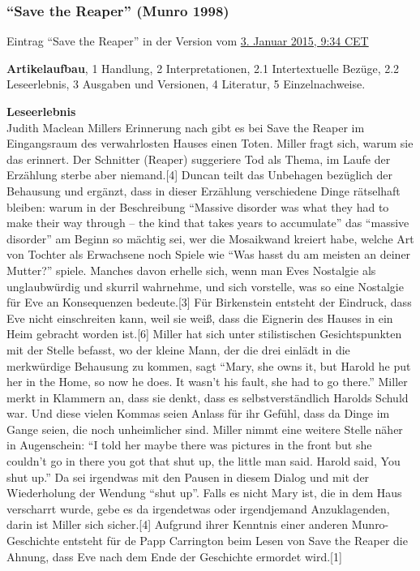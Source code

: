 \documentclass[fontsize=12pt]{scrartcl}
\begin{document}
\subsubsection{"`Save the Reaper"' (Munro 1998)}
\label{subsubsec:6.1.8}

Eintrag "`Save the Reaper"' in der Version vom \href{https://de.wikipedia.org/w/index.php?title=Save_the_Reaper\&oldid=137361185}{3. Januar 2015, 9:34 CET}

\textbf{Artikelaufbau}, 1 Handlung, 2 Interpretationen, 2.1 Intertextuelle Bez\"uge, 2.2 Le\-se\-er\-lebnis, 3 Ausgaben und Versionen, 4 Li\-te\-ra\-tur, 5 Einzelnachweise.

\textbf{Leseerlebnis}\\
Judith Maclean Millers Erinnerung nach gibt es bei Save the Reaper im Ein\-gangs\-raum des verwahrlosten Hauses einen Toten. Miller fragt sich, warum sie das erinnert. Der Schnitter (Reaper) suggeriere Tod als Thema, im Laufe der Erz\"ahlung sterbe aber niemand.[4] Duncan teilt das Unbehagen bez\"uglich der Behausung und erg\"anzt, dass in dieser Erz\"ahlung verschiedene Dinge r\"atselhaft bleiben: warum in der Beschreibung "`Massive disorder was what they had to make their way through -- the kind that takes years to accumulate"' das "`massive disorder"' am Beginn so m\"achtig sei, wer die Mosaikwand kreiert habe, welche Art von Tochter als Erwachsene noch Spiele wie "`Was hasst du am meisten an deiner Mutter?"' spiele. Manches davon erhelle sich, wenn man Eves Nostalgie als unglaub\-w\"urdig und skurril wahrnehme, und sich vorstelle, was so eine Nostalgie f\"ur Eve an Konsequenzen bedeute.[3] F\"ur Birkenstein entsteht der Eindruck, dass Eve nicht einschrei\-ten kann, weil sie wei{\ss}, dass die Eignerin des Hauses in ein Heim gebracht worden ist.[6] Miller hat sich unter stilistischen Gesichtspunkten mit der Stelle befasst, wo der kleine Mann, der die drei einl\"adt in die merkw\"urdige Behausung zu kommen, sagt "`Mary, she owns it, but Harold he put her in the Home, so now he does. It wasn't his fault, she had to go there."' Miller merkt in Klammern an, dass sie denkt, dass es \mbox{selbst}verst\"andlich Harolds Schuld war. Und diese vielen Kommas seien Anlass f\"ur ihr Gef\"uhl, dass da Dinge im Gange seien, die noch unheimlicher sind. Miller nimmt eine weitere Stelle n\"aher in Augenschein: "`\flq I told her maybe there was pictures in the front but she couldn't go in there you got that shut up,\frq\,\,the little man said. Harold said, \flq You shut up.\frq"' Da sei irgendwas mit den Pausen in diesem Dialog und mit der Wiederholung der Wendung "`shut up"'. Falls es nicht Mary ist, die in dem Haus verscharrt wurde, gebe es da irgendetwas oder irgendjemand Anzuklagenden, darin ist Miller sich sicher.[4] Aufgrund ihrer Kenntnis einer anderen Munro-Geschichte entsteht f\"ur de Papp Carrington beim Lesen von Save the Reaper die Ahnung, dass Eve nach dem Ende der Geschichte ermordet wird.[1]
\end{document}
